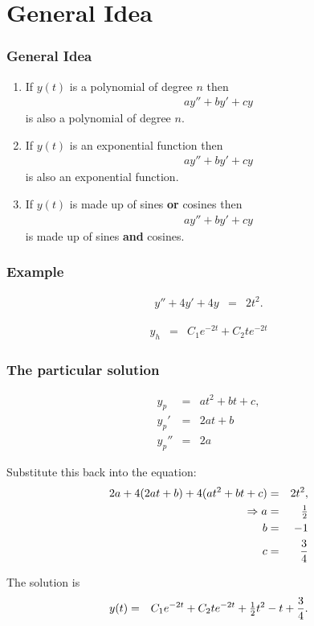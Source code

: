 \section{General Idea}

\begin{frame}
  \frametitle{General Idea}

  \begin{enumerate}
  \item If $y(t)$ is a polynomial of degree $n$ then
    \begin{eqnarray*}
      a y'' + b y' + cy 
    \end{eqnarray*}
    is also a polynomial of degree $n$.
  \item If $y(t)$ is an exponential function then
    \begin{eqnarray*}
      a y'' + by' + cy 
    \end{eqnarray*}
    is also an exponential function.
  \item If $y(t)$ is made up of sines \textbf{or} cosines then
    \begin{eqnarray*}
      a y'' + by' + cy
    \end{eqnarray*}
    is  made up of sines \textbf{and} cosines.
  \end{enumerate}

\end{frame}


\begin{frame}
  \frametitle{Example}

  \begin{eqnarray*}
    y'' + 4y' + 4y & = & 2t^2.
  \end{eqnarray*}

  {
    \begin{eqnarray*}
      y_h & = & C_1 e^{-2t} + C_2 t e^{-2t}
    \end{eqnarray*}
  }

\end{frame}


\begin{frame}
  \frametitle{The particular solution}

  \begin{eqnarray*}
    y_p & = & at^2 + bt + c, \\
    y_p' & = & 2at + b \\
    y_p'' & = & 2a
  \end{eqnarray*}

  Substitute this back into the equation:
  \begin{eqnarray*}
    2a + 4 (2at+b) + 4 (at^2 + bt + c) & = & 2t^2, \\
    \Rightarrow 
    a & = & \mbox{$\frac{1}{2}$} \\
    b & = & -1 \\
    c & = & \frac{3}{4}
  \end{eqnarray*}

  The solution is 
  \begin{eqnarray*}
    y(t) & = & C_1 e^{-2t} + C_2 t e^{-2t} + \mbox{$\frac{1}{2}$} t^2 - t + \frac{3}{4}.
  \end{eqnarray*}

\end{frame}


